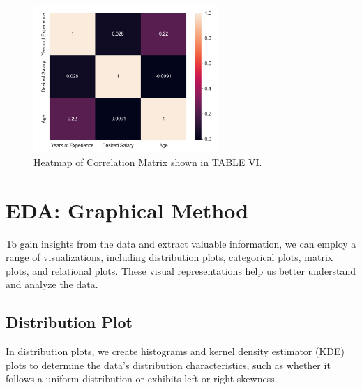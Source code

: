 \documentclass[journal]{IEEEtai}
\begin{document}
\begin{figure} [htbp]
\centerline{\includegraphics[width=16.5pc]{figures/HeatMap.png}}
\caption{Heatmap of Correlation Matrix shown in TABLE VI.}
\end{figure}



\section{EDA: Graphical Method}
To gain insights from the data and extract valuable information, we can employ a range of visualizations, including distribution plots, categorical plots, matrix plots, and relational plots. These visual representations help us better understand and analyze the data.

\subsection{Distribution Plot}
In distribution plots, we create histograms and kernel density estimator (KDE) plots to determine the data's distribution characteristics, such as whether it follows a uniform distribution or exhibits left or right skewness.
\end{document}
